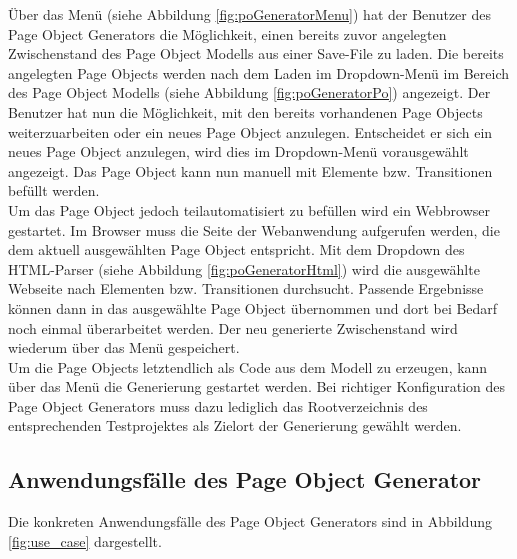 Über das Menü (siehe Abbildung \ref{fig:poGeneratorMenu}) hat der Benutzer des Page Object Generators die Möglichkeit, einen bereits zuvor angelegten Zwischenstand des Page Object Modells aus einer Save-File zu laden. Die bereits angelegten Page Objects werden nach dem Laden im Dropdown-Menü im Bereich des Page Object Modells (siehe Abbildung \ref{fig:poGeneratorPo}) angezeigt. Der Benutzer hat nun die Möglichkeit, mit den bereits vorhandenen Page Objects weiterzuarbeiten oder ein neues Page Object anzulegen. Entscheidet er sich ein neues Page Object anzulegen, wird dies im Dropdown-Menü vorausgewählt angezeigt. Das Page Object kann nun manuell mit Elemente bzw. Transitionen befüllt werden.\\ Um das Page Object jedoch teilautomatisiert zu befüllen wird ein Webbrowser gestartet. Im Browser muss die Seite der Webanwendung aufgerufen werden, die dem aktuell ausgewählten Page Object entspricht. Mit dem Dropdown des HTML-Parser (siehe Abbildung \ref{fig:poGeneratorHtml}) wird die ausgewählte Webseite nach Elementen bzw. Transitionen durchsucht.
Passende Ergebnisse können dann in das ausgewählte Page Object übernommen und dort bei Bedarf noch einmal überarbeitet werden.
Der neu generierte Zwischenstand wird wiederum über das Menü gespeichert.\\
Um die Page Objects letztendlich als Code aus dem Modell zu erzeugen, kann über das Menü die Generierung gestartet werden. Bei richtiger Konfiguration des Page Object Generators muss dazu lediglich das Rootverzeichnis des entsprechenden Testprojektes als Zielort der Generierung gewählt werden.


\subsection{Anwendungsfälle des Page Object Generator}
\label{sec:page_object_generator_usecases}

Die konkreten Anwendungsfälle des Page Object Generators sind in Abbildung \ref{fig:use_case} dargestellt.

